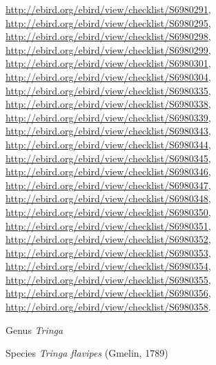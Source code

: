 \documentclass[9pt, article]{memoir}
\begin{document}
\begin{multicols}{2}
\url{http://ebird.org/ebird/view/checklist/S6980291}, 
\url{http://ebird.org/ebird/view/checklist/S6980295}, 
\url{http://ebird.org/ebird/view/checklist/S6980298}, 
\url{http://ebird.org/ebird/view/checklist/S6980299}, 
\url{http://ebird.org/ebird/view/checklist/S6980301}, 
\url{http://ebird.org/ebird/view/checklist/S6980304}, 
\url{http://ebird.org/ebird/view/checklist/S6980335}, 
\url{http://ebird.org/ebird/view/checklist/S6980338}, 
\url{http://ebird.org/ebird/view/checklist/S6980339}, 
\url{http://ebird.org/ebird/view/checklist/S6980343}, 
\url{http://ebird.org/ebird/view/checklist/S6980344}, 
\url{http://ebird.org/ebird/view/checklist/S6980345}, 
\url{http://ebird.org/ebird/view/checklist/S6980346}, 
\url{http://ebird.org/ebird/view/checklist/S6980347}, 
\url{http://ebird.org/ebird/view/checklist/S6980348}, 
\url{http://ebird.org/ebird/view/checklist/S6980350}, 
\url{http://ebird.org/ebird/view/checklist/S6980351}, 
\url{http://ebird.org/ebird/view/checklist/S6980352}, 
\url{http://ebird.org/ebird/view/checklist/S6980353}, 
\url{http://ebird.org/ebird/view/checklist/S6980354}, 
\url{http://ebird.org/ebird/view/checklist/S6980355}, 
\url{http://ebird.org/ebird/view/checklist/S6980356}, 
\url{http://ebird.org/ebird/view/checklist/S6980358}.

\vspace{6pt}\noindent\hspace{30pt}Genus \textit{Tringa}


\vspace{6pt}\noindent\hspace{36pt}Species \textit{Tringa flavipes} (Gmelin, 1789)



\end{multicols}
\end{document}
